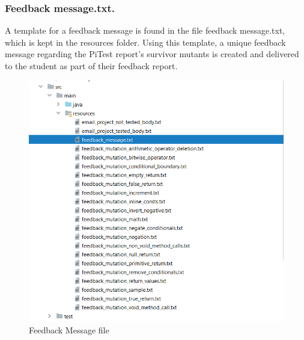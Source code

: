 \subsubsection{Feedback message.txt.}
A template for a feedback message is found in the file feedback message.txt, which is kept in the resources folder. Using this template, a unique feedback message regarding the PiTest report's survivor mutants is created and delivered to the student as part of their feedback report.
\begin{figure}[h!]
	\centering
	\includegraphics[scale=1]{fig35.png}
	\caption{Feedback Message file}
	\label{fig:f11}
\end{figure}
\newpage
